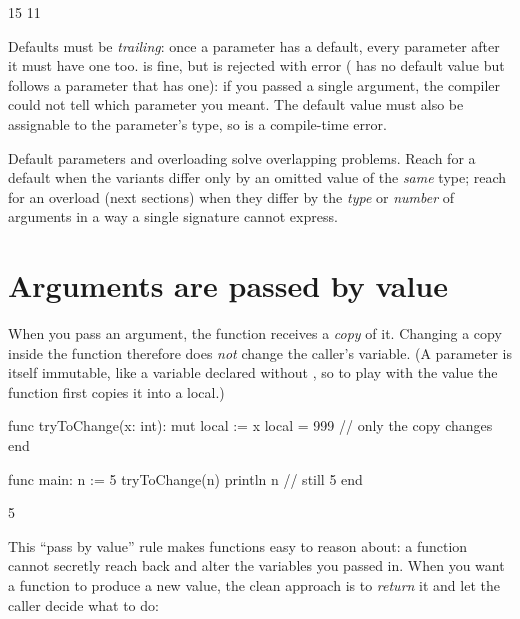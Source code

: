 \begin{progout}
15
11
\end{progout}

\begin{warn}
Defaults must be \emph{trailing}: once a parameter has a default, every parameter
after it must have one too.  is fine, but
 is rejected with error  ( has no
default value but follows a parameter that has one): if you passed a single argument, the compiler could not tell which parameter you meant. The
default value must also be assignable to the parameter's type, so
 is a compile-time error.
\end{warn}

\begin{note}
Default parameters and overloading solve overlapping problems. Reach for a default
when the variants differ only by an omitted value of the \emph{same} type; reach
for an overload (next sections) when they differ by the \emph{type} or
\emph{number} of arguments in a way a single signature cannot express.
\end{note}

\section{Arguments are passed by value}

When you pass an argument, the function receives a \emph{copy} of it. Changing a
copy inside the function therefore does \emph{not} change the caller's
variable. (A parameter is itself immutable, like a variable declared without
, so to play with the value the function first copies it into a
 local.)

\begin{salamen}
func tryToChange(x: int):
    mut local := x
    local = 999            // only the copy changes
end

func main:
    n := 5
    tryToChange(n)
    println n              // still 5
end
\end{salamen}

\begin{progout}
5
\end{progout}

This ``pass by value'' rule makes functions easy to reason about: a function
cannot secretly reach back and alter the variables you passed in. When you want a
function to produce a new value, the clean approach is to \emph{return} it and let
the caller decide what to do:

